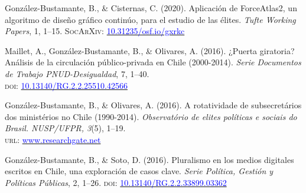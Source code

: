 \begin{publications}

\begin{benumerate}{4}


\item{\small Gonz\'alez-Bustamante, B., \& Cisternas, C. (2020). Aplicación de ForceAtlas2, un algoritmo de diseño gráfico continúo, para el estudio de las élites. {\itshape Tufte Working Papers}, 1, 1--15. {\scshape \footnotesize SocArXiv}: \href{https://doi.org/10.31235/osf.io/gxrkc}{\textcolor{blue}{10.31235/osf.io/gxrkc}}} \vspace{1mm}

\item{\small Maillet, A., Gonz\'alez-Bustamante, B., \& Olivares, A. (2016). ¿Puerta giratoria? Análisis de la circulación público-privada en Chile (2000-2014). {\itshape Serie Documentos de Trabajo PNUD-Desigualdad}, 7, 1--40. \\ {\scshape doi}: \href{http://doi.org/10.13140/RG.2.2.25510.42566}{\textcolor{blue}{10.13140/RG.2.2.25510.42566}}} \vspace{1mm}

\item{\small Gonz\'alez-Bustamante, B., \& Olivares, A. (2016). A rotatividade de subsecretários dos ministérios no Chile (1990-2014). {\itshape Observat\'orio de elites pol\'iticas e sociais do Brasil. NUSP/UFPR, 3}(5), 1--19. \\ {\scshape url}: \href{https://www.researchgate.net/publication/321993740_A_rotatividade_de_subsecretarios_dos_ministerios_no_Chile_1990-2014}{\textcolor{blue}{www.researchgate.net}}} \vspace{1mm}

\item{\small Gonz\'alez-Bustamante, B., \& Soto, D. (2016). Pluralismo en los medios digitales escritos en Chile, una exploración de casos clave. {\itshape Serie Pol\'itica, Gesti\'on y Pol\'iticas P\'ublicas}, 2, 1--26. {\scshape doi}: \href{http://doi.org/10.13140/RG.2.2.33899.03362}{\textcolor{blue}{10.13140/RG.2.2.33899.03362}}}
\end{benumerate}

\end{publications}
